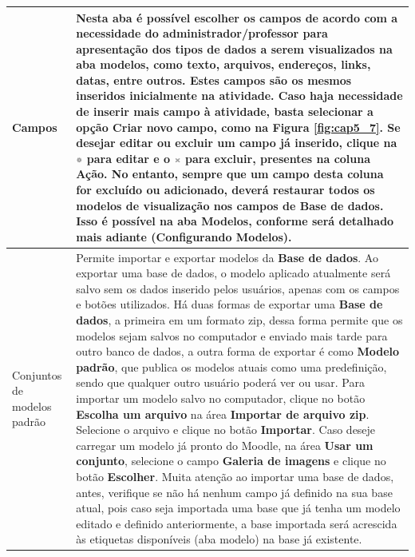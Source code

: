 \begin{longtable}{p{4.5cm}|p{10.5cm}}
 {Campos} & Nesta aba é possível escolher os campos de acordo com a necessidade do administrador/professor para apresentação dos tipos de dados a serem visualizados na aba modelos, como texto, arquivos, endereços, links, datas, entre outros. Estes campos são os mesmos inseridos inicialmente na atividade. Caso haja necessidade de inserir mais campo à atividade, basta selecionar a opção \textbf{Criar novo campo}, como na Figura \ref{fig:cap5_7}. Se desejar editar ou excluir um campo já inserido, clique na \includegraphics[width=0.02\textwidth]{imagem/cap5/fig7.jpg} para editar e o \includegraphics[width=0.02\textwidth]{imagem/cap5/fig8.jpg} para excluir, presentes na coluna \textbf{Ação}.
No entanto, sempre que um campo desta coluna for excluído ou adicionado, deverá restaurar todos os modelos de visualização nos campos de \textbf{Base de dados}. Isso é possível na aba \textbf{Modelos}, conforme será detalhado mais adiante (\textbf{Configurando Modelos}).\\\hline
 
 {Conjuntos de modelos padrão} & Permite importar e exportar modelos da \textbf{Base de dados}. Ao exportar uma base de dados, o modelo aplicado atualmente será salvo sem os dados inserido pelos usuários, apenas com os campos e botões utilizados. Há duas formas de exportar uma \textbf{Base de dados}, a primeira em um formato zip, dessa forma permite que os modelos sejam salvos no computador e enviado mais tarde para outro banco de dados, a outra forma de exportar é como \textbf{Modelo padrão}, que publica os modelos atuais como uma predefinição, sendo que qualquer outro usuário poderá ver ou usar. Para importar um modelo salvo no computador, clique no botão \textbf{Escolha um arquivo} na área \textbf{Importar de arquivo zip}. Selecione o arquivo e clique no botão \textbf{Importar}. Caso deseje carregar um modelo já pronto do Moodle, na área \textbf{Usar um conjunto}, selecione o campo \textbf{Galeria de imagens} e clique no botão \textbf{Escolher}. Muita atenção ao importar uma base de dados, 
antes, verifique se não há nenhum campo já definido na sua base atual, pois caso seja importada uma base que já tenha um modelo editado e definido anteriormente, a base importada será acrescida às etiquetas disponíveis (aba modelo) na base já existente.\\\hline
\end{longtable}


